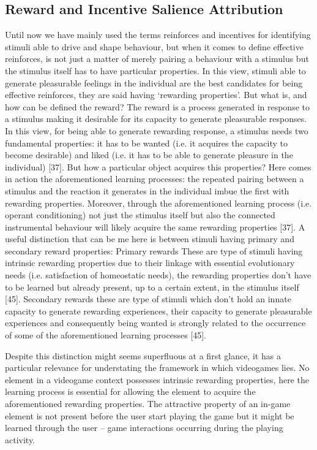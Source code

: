 \subsection{Reward and Incentive Salience Attribution}
\label{incentive_salience}
Until now we have mainly used the terms reinforces and incentives for identifying stimuli able to drive and shape behaviour, but when it comes to define effective reinforces, is not just a matter of merely pairing a behaviour with a stimulus but the stimulus itself has to have particular properties. In this view, stimuli able to generate pleasurable feelings in the individual are the best candidates for being effective reinforces,  they are said having ‘rewarding properties’.  But what is, and how can be defined the reward?  The reward is a process generated in response to a stimulus making it desirable for its capacity to generate pleasurable responses. In this view, for being able to generate rewarding response, a stimulus needs two fundamental properties: it has to be wanted (i.e. it acquires the capacity to become desirable) and liked (i.e. it has to be able to generate pleasure in the individual) [37]. But how a particular object acquires this properties? Here comes in action the aforementioned learning processes: the repeated pairing between a stimulus and the reaction it generates in the individual imbue the first with rewarding properties. Moreover, through the aforementioned learning process (i.e. operant conditioning) not just the stimulus itself but also the connected instrumental behaviour will likely acquire the same rewarding properties [37]. A useful distinction that can be me here is between stimuli having primary and secondary reward properties:
Primary rewards 
These are type of stimuli having intrinsic rewarding properties due to their linkage with essential evolutionary needs (i.e. satisfaction of homeostatic needs),  the rewarding properties don’t have to be learned but already present, up to a certain extent, in the stimulus itself [45]. 
Secondary rewards
these are type of stimuli which don’t hold an innate capacity to generate rewarding experiences, their capacity to generate pleasurable experiences and consequently being wanted is strongly related to the occurrence of some of the aforementioned learning processes [45].

Despite this distinction might seems superfluous at a first glance, it has a particular relevance for understating the framework in which videogames lies. No element in a videogame context possesses intrinsic rewarding properties, here the learning process is essential for allowing the element to acquire the aforementioned rewarding properties. The attractive property of an in-game element is not present before the user start playing the game but it might be learned through the user – game interactions occurring during the playing activity.

